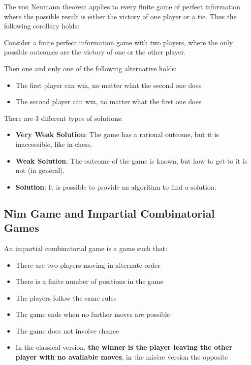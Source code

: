 \documentclass[../main.tex]{subfiles}
\begin{document}
The von Neumann theorem applies to every finite game of perfect information where the possible result is either the victory of one player or a tie. Thus the following corollary holds:
\begin{corollary}
    Consider a finite perfect information game with two players, where the only possible outcomes are the victory of one or the other player.

    Then one and only one of the following alternative holds:
    \begin{itemize}
        \item The first player can win, no matter what the second one does
        \item The second player can win, no matter what the first one does
    \end{itemize}
\end{corollary}

There are 3 different types of solutions:
\begin{itemize}
    \item \textbf{Very Weak Solution}: The game has a rational outcome, but it is inaccessible, like in chess.
    \item \textbf{Weak Solution}: The outcome of the game is known, but how to get to it is not (in general).
    \item \textbf{Solution}: It is possible to provide an algorithm to find a solution.
\end{itemize}

\subsection{Nim Game and Impartial Combinatorial Games}
\vspace*{0.3cm}
\begin{definition}
    An impartial combinatorial game is a game such that:
    \begin{itemize}
        \item There are two players moving in alternate order
        \item There is a finite number of positions in the game
        \item The players follow the same rules
        \item The game ends when no further moves are possible
        \item The game does not involve chance
        \item  In the classical version, \textbf{the winner is the player leaving the other player with no available moves}, in the misère version the opposite
    \end{itemize}
\end{definition}
\end{document}
